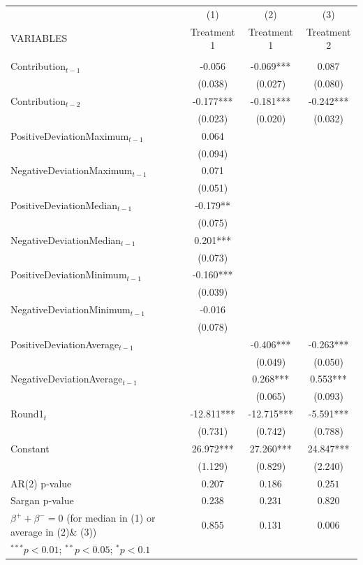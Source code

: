 
\begin{tabular}{lccc} \hline
 & (1) & (2) & (3) \\
VARIABLES & Treatment 1 & Treatment 1 & Treatment 2 \\ \hline
 &  &  &  \\
Contribution$_{t-1}$    & -0.056 & -0.069*** & 0.087 \\
 & (0.038) & (0.027) & (0.080) \\
Contribution$_{t-2}$    & -0.177*** & -0.181*** & -0.242*** \\
 & (0.023) & (0.020) & (0.032) \\
PositiveDeviationMaximum$_{t-1}$    & 0.064 &  &  \\
 & (0.094) &  &  \\
NegativeDeviationMaximum$_{t-1}$ & 0.071 &  &  \\
 & (0.051) &  &  \\
PositiveDeviationMedian$_{t-1}$ & -0.179** &  &  \\
 & (0.075) &  &  \\
NegativeDeviationMedian$_{t-1}$& 0.201*** &  &  \\
 & (0.073) &  &  \\
PositiveDeviationMinimum$_{t-1}$ & -0.160*** &  &  \\
 & (0.039) &  &  \\
NegativeDeviationMinimum$_{t-1}$ & -0.016 &  &  \\
 & (0.078) &  &  \\
PositiveDeviationAverage$_{t-1}$ &  & -0.406*** & -0.263*** \\
 &  & (0.049) & (0.050) \\
NegativeDeviationAverage$_{t-1}$  &  & 0.268*** & 0.553*** \\
 &  & (0.065) & (0.093) \\
Round1$_{t}$ & -12.811*** & -12.715*** & -5.591*** \\
 & (0.731) & (0.742) & (0.788) \\
Constant & 26.972*** & 27.260*** & 24.847*** \\
 & (1.129) & (0.829) & (2.240) \\
 \midrule
AR(2) p-value                                     & $0.207$         & $0.186$         & $0.251$        \\
Sargan p-value                                    & $0.238$         & $0.231$         & $0.820$        \\
$\beta^{+} + \beta^{-} = 0$ (for median in (1) or average in (2)\& (3)) & $0.855$         & $0.131$         & $0.006$       \\
\bottomrule
\multicolumn{3}{l}{\scriptsize{$^{***}p<0.01$; $^{**}p<0.05$; $^{*}p<0.1$}}
\end{tabular}
